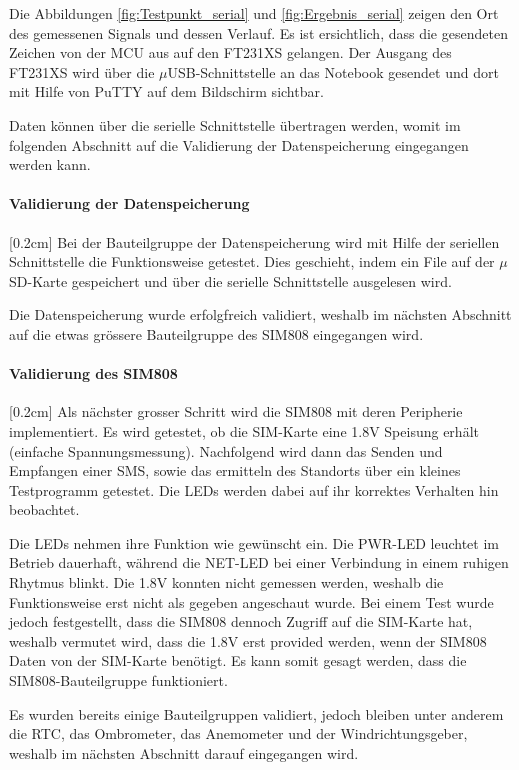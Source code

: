 Die Abbildungen \ref{fig:Testpunkt_serial} und \ref{fig:Ergebnis_serial} zeigen den Ort des gemessenen Signals und dessen Verlauf. Es ist ersichtlich, dass die gesendeten Zeichen von der MCU aus auf den FT231XS gelangen. Der Ausgang des FT231XS wird über die $\mu$USB-Schnittstelle an das Notebook gesendet und dort mit Hilfe von PuTTY auf dem Bildschirm sichtbar.

Daten können über die serielle Schnittstelle übertragen werden, womit im folgenden Abschnitt auf die Validierung der Datenspeicherung eingegangen werden kann.

\paragraph{\textbf{Validierung der Datenspeicherung}}[0.2cm]
Bei der Bauteilgruppe der Datenspeicherung wird mit Hilfe der seriellen Schnittstelle die Funktionsweise getestet. Dies geschieht, indem ein File auf der $\mu$SD-Karte gespeichert und über die serielle Schnittstelle ausgelesen wird.


Die Datenspeicherung wurde erfolgfreich validiert, weshalb im nächsten Abschnitt auf die etwas grössere Bauteilgruppe des SIM808 eingegangen wird.

\paragraph{\textbf{Validierung des SIM808}}[0.2cm]
Als nächster grosser Schritt wird die SIM808 mit deren Peripherie implementiert. Es wird getestet, ob die SIM-Karte eine 1.8V Speisung erhält (einfache Spannungsmessung). Nachfolgend wird dann das Senden und Empfangen einer SMS, sowie das ermitteln des Standorts über ein kleines Testprogramm getestet. Die LEDs werden dabei auf ihr korrektes Verhalten hin beobachtet. 

Die LEDs nehmen ihre Funktion wie gewünscht ein. Die PWR-LED leuchtet im Betrieb dauerhaft, während die NET-LED bei einer Verbindung in einem ruhigen Rhytmus blinkt. Die 1.8V konnten nicht gemessen werden, weshalb die Funktionsweise erst nicht als gegeben angeschaut wurde. Bei einem Test wurde jedoch festgestellt, dass die SIM808 dennoch Zugriff auf die SIM-Karte hat, weshalb vermutet wird, dass die 1.8V erst provided werden, wenn der SIM808 Daten von der SIM-Karte benötigt. Es kann somit gesagt werden, dass die SIM808-Bauteilgruppe funktioniert.

Es wurden bereits einige Bauteilgruppen validiert, jedoch bleiben unter anderem die RTC, das Ombrometer, das Anemometer und der Windrichtungsgeber, weshalb im nächsten Abschnitt darauf eingegangen wird.

